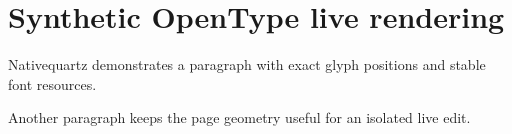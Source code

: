 \documentclass{article}
\begin{document}
\section{Synthetic OpenType live rendering}
Nativequartz demonstrates a paragraph with exact glyph positions and stable font resources.

Another paragraph keeps the page geometry useful for an isolated live edit.
\end{document}

